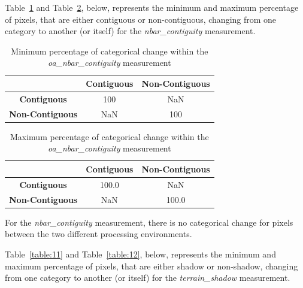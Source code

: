 \documentclass[a4paper]{article}
\begin{document}
    \begin{flushleft}
      Table~\ref{table:9} and Table~\ref{table:10}, below, represents the minimum and maximum percentage of pixels, that are either contiguous or non-contiguous, changing from one category to another (or itself) for the \textit{nbar\_contiguity} measurement.
    \end{flushleft}

    \begin{table}[ht!]
      \caption{Minimum percentage of categorical change within the \textit{oa\_nbar\_contiguity} measurement}\label{table:9}
      \centering
      \begin{tabular}{ccc} \midrule
        & \textbf{Contiguous} & \textbf{Non-Contiguous} \\ \midrule
        \textbf{Contiguous} & 100 & NaN \\
        \textbf{Non-Contiguous} & NaN & 100 \\
      \end{tabular}
    \end{table}

    \begin{table}[ht!]
      \caption{Maximum percentage of categorical change within the \textit{oa\_nbar\_contiguity} measurement}\label{table:10}
      \centering
      \begin{tabular}{ccc} \midrule
        & \textbf{Contiguous} & \textbf{Non-Contiguous} \\ \midrule
        \textbf{Contiguous} & 100.0 & NaN \\
        \textbf{Non-Contiguous} & NaN & 100.0 \\
      \end{tabular}
    \end{table}

    \begin{flushleft}
      For the \textit{nbar\_contiguity} measurement, there is no categorical change for pixels between the two different processing environments.
    \end{flushleft}

  \clearpage

    \begin{flushleft}
      Table~\ref{table:11} and Table~\ref{table:12}, below, represents the minimum and maximum percentage of pixels, that are either shadow or non-shadow, changing from one category to another (or itself) for the \textit{terrain\_shadow} measurement.
    \end{flushleft}
\end{document}
